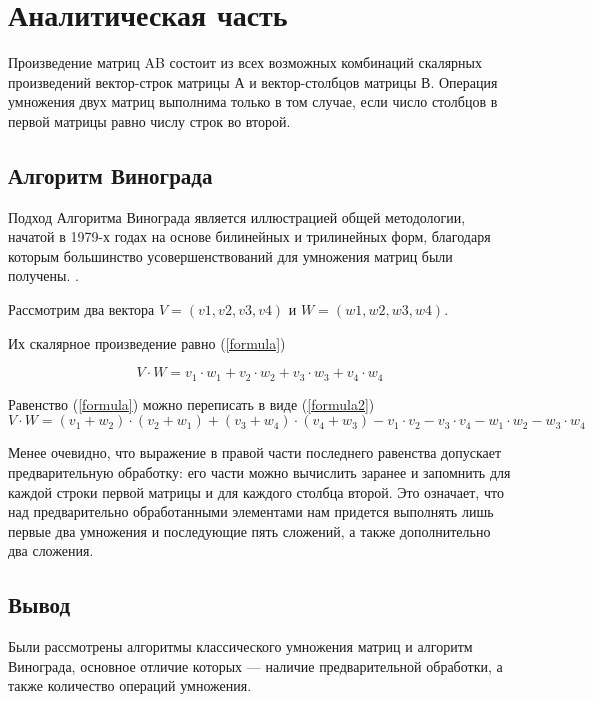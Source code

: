 \documentclass[12pt]{report}
\begin{document}
\chapter{Аналитическая часть}
Произведение матриц AB состоит из всех возможных комбинаций скалярных произведений вектор-строк матрицы А и вектор-столбцов матрицы В.
Операция умножения двух матриц выполнима только в том случае, если число столбцов в первой матрицы равно числу строк во второй.


\section{Алгоритм Винограда}
Подход Алгоритма Винограда является иллюстрацией общей методологии, начатой в 1979-х годах на основе
билинейных и трилинейных форм, благодаря которым большинство усовершенствований для умножения матриц были получены. \cite{vinograd}.

Рассмотрим два вектора $V = (v1, v2, v3, v4)$ и $W = (w1, w2, w3, w4)$.  

 Их скалярное произведение равно (\ref{formula}) 

\begin{equation} \label{formula}
V \cdot W=v_1 \cdot w_1 + v_2 \cdot w_2 + v_3 \cdot w_3 + v_4 \cdot w_4
\end{equation}

Равенство (\ref{formula}) можно переписать в виде (\ref{formula2}) 
\begin{equation} \label{formula2}
V \cdot W=(v_1 + w_2) \cdot (v_2 + w_1) + (v_3 + w_4) \cdot (v_4 + w_3) - v_1 \cdot v_2 - v_3 \cdot v_4 - w_1 \cdot w_2 - w_3 \cdot w_4
\end{equation}

Менее очевидно, что выражение в правой части последнего равенства допускает предварительную обработку: его части можно вычислить заранее и запомнить для каждой строки первой матрицы и для каждого столбца второй. 
Это означает, что над предварительно обработанными элементами нам придется выполнять лишь первые два умножения и последующие пять сложений, а также дополнительно два сложения. 

\section{Вывод}
Были рассмотрены алгоритмы классического умножения матриц и алгоритм Винограда, основное отличие которых — наличие предварительной обработки, а также количество операций умножения.
\end{document}
